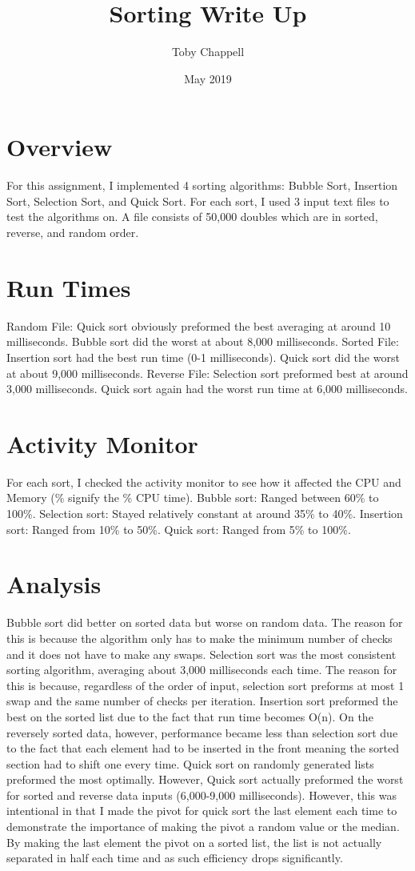 \documentclass{article}
\title{Sorting Write Up}
\author{Toby Chappell }
\date{May 2019}
\begin{document}
\maketitle

\section{Overview}
For this assignment, I implemented 4 sorting algorithms: Bubble Sort, Insertion Sort, Selection Sort, and Quick Sort. For each sort, I used 3 input text files to test the algorithms on. A file consists of 50,000 doubles which are in sorted, reverse, and random order.

\section{Run Times}
Random File: Quick sort obviously preformed the best averaging at around 10 milliseconds. Bubble sort did the worst at about 8,000 milliseconds.
Sorted File: Insertion sort had the best run time (0-1 milliseconds). Quick sort did the worst at about 9,000 milliseconds.
Reverse File: Selection sort preformed best at around 3,000 milliseconds.  Quick sort again had the worst run time at 6,000 milliseconds.

\section{Activity Monitor}
For each sort, I checked the activity monitor to see how it affected the CPU and Memory (\% signify the \% CPU time).  
Bubble sort: Ranged between 60\% to 100\%.
Selection sort: Stayed relatively constant at around 35\% to 40\%.
Insertion sort: Ranged from 10\% to 50\%.
Quick sort: Ranged from 5\% to 100\%.

\section{Analysis}
Bubble sort did better on sorted data but worse on random data. The reason for this is because the algorithm only has to make the minimum number of checks and it does not have to make any swaps. Selection sort was the most consistent sorting algorithm, averaging about 3,000 milliseconds each time. The reason for this is because, regardless of the order of input, selection sort preforms at most 1 swap and the same number of checks per iteration. Insertion sort preformed the best on the sorted list due to the fact that run time becomes O(n). On the reversely sorted data, however, performance became less than selection sort due to the fact that each element had to be inserted in the front meaning the sorted section had to shift one every time. Quick sort on randomly generated lists preformed the most optimally. However, Quick sort actually preformed the worst for sorted and reverse data inputs (6,000-9,000 milliseconds). However, this was intentional in that I made the pivot for quick sort the last element each time to demonstrate the importance of making the pivot a random value or the median. By making the last element the pivot on a sorted list, the list is not actually separated in half each time and as such efficiency drops significantly.
\end{document}

